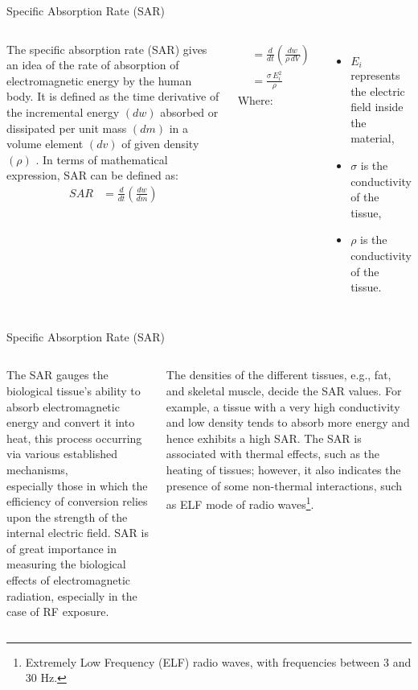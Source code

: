 \documentclass[7pt, aspectratio=169]{beamer}
\begin{document}
\begin{frame}{Specific Absorption Rate (SAR)}
\begin{columns}
    The specific absorption rate (SAR) gives an idea of the rate of absorption of electromagnetic energy by the human body. It is defined as the time derivative of the incremental energy \((dw)\) absorbed or dissipated per unit mass \((dm)\) in a volume element \((dv)\) of given density 
\((\rho)\) . In terms of mathematical expression, SAR can be defined as\autocite{kumar2011effect}:
    \begin{align*}
    SAR &= \frac{d}{dt}\left(\frac{dw}{dm}\right) \\
    \end{align*}

    \begin{align*}
        &= \frac{d}{dt}\left(\frac{dw}{\rho \, dV}\right) \\
        &= \frac{\sigma \, E_i^2}{\rho}
    \end{align*}
    Where:
    \begin{itemize}
        \item \(E_i\) represents the electric field inside the material,
        \item \(\sigma\) is the conductivity of the tissue,
        \item \(\rho\) is the conductivity of the tissue.
    \end{itemize}

    
\end{columns}
    
\end{frame}
\begin{frame}{Specific Absorption Rate (SAR)}
\begin{columns}
    The SAR gauges the biological tissue's ability to absorb electromagnetic energy and convert it into heat, this process occurring via various established mechanisms,\\
    \vspace{0.1cm}
    especially those in which the efficiency of conversion relies upon the strength of the internal electric field. SAR is of great importance in measuring the biological effects of electromagnetic radiation, especially in the case of RF exposure.


    The densities of the different tissues, e.g., fat, and skeletal muscle, decide the SAR values. For example, a tissue with a very high conductivity and low density tends to absorb more energy and hence exhibits a high SAR. The SAR is associated with thermal effects, such as the heating of tissues; however, it also indicates the presence of some non-thermal interactions, such as ELF mode of radio waves\footnote{Extremely Low Frequency (ELF) radio waves, with frequencies between 3 and 30 Hz.}.
    
\end{columns}
    
\end{frame}
\end{document}
